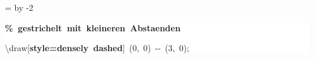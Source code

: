\begingroup
\ttfamily
{}
=\textwidth
\advance{} by -2\fboxsep
\noindent
\colorbox{background}
{%
\parbox{\dimen255}
{%
\rule[-0.5ex]{0pt}{2.5ex}\hspace*{0.0em}\textcolor{G}{\textbf{\%~gestrichelt~mit~kleineren~Abstaenden}}\\
\rule[-0.5ex]{0pt}{2.5ex}\hspace*{0.0em}\textbackslash{}draw[\textcolor{R}{\textbf{style=densely~dashed}}]~(0,~0)~{-}{-}~(3,~0);}%
}%
\endgroup
